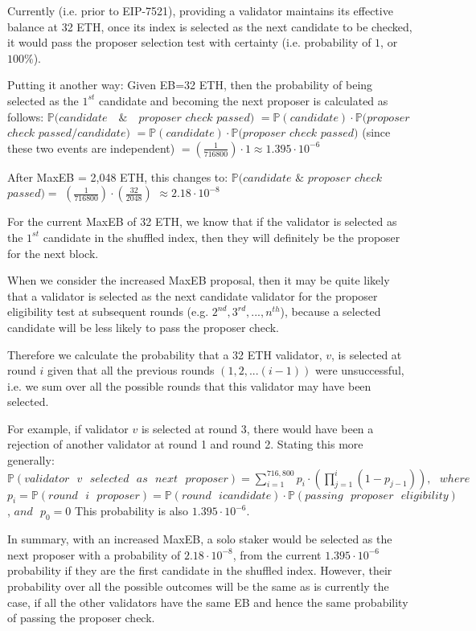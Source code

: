 \documentclass{article}
\newcommand{\prob}{\mathbb P}
\begin{document}
Currently (i.e. prior to EIP-7521), providing a validator maintains its
effective balance at 32 ETH, once its index is selected as the next candidate
to be checked, it would pass the proposer selection test with certainty (i.e.
probability of $1$, or $100\%$).


Putting it another way:
Given EB=32 ETH, then the probability of being selected as the $1^{st}$
candidate and becoming the next proposer is calculated as follows: $\prob(candidate
\texttt{ }$ $\&$ $\texttt{ }proposer$ $check$ $passed)$  $= \prob(candidate) \cdot
\prob(proposer$ $check$ $passed / candidate)$  $= \prob(candidate) \cdot \prob(proposer$
$check$ $passed)$ (since these two events are independent)  $=
\left(\frac{1}{716800}\right) \cdot 1 \approx 1.395 \cdot 10^{-6}$

After MaxEB = 2,048 ETH, this changes to:
$\prob(candidate$ $\&$ $proposer$ $check$ $passed) =$
$\left(\frac{1}{716800}\right) \cdot \left(\frac{32}{2048}\right)$
$\approx 2.18\cdot 10^{-8}$

For the current MaxEB of 32 ETH, we know that if the validator is selected as
the $1^{st}$ candidate in the shuffled index, then they will definitely be the
proposer for the next block.

When we consider the increased MaxEB proposal, then it may be quite likely that
a validator is selected as the next candidate validator for the proposer
eligibility test at subsequent rounds (e.g. $2^{nd}, 3^{rd}, ..., n^{th}$),
because a selected candidate will be less likely to pass the proposer check.

Therefore we calculate the probability that a 32 ETH validator, $v$, is
selected at round $i$ given that all the previous rounds $(1,2, ... (i-1))$
were unsuccessful, i.e. we sum over all the possible rounds that this validator
may have been selected.

For example, if validator $v$ is selected at round 3, there would have been a
rejection of another validator at round 1 and round 2. Stating this more
generally:  $\prob(validator \texttt{ } v \texttt{ } selected \texttt{ } as
\texttt{ } next \texttt{ } proposer) = \sum_{i=1}^{716,800} p_i \cdot  \left(
\prod_{j=1}^i (1-p_{j-1}) \right), \texttt{ } where$ 
$p_i = \prob(round \texttt{ }i \texttt{ } proposer) = \prob(round \texttt{ } i \texttt{
} candidate) \cdot  \prob(passing \texttt{ } proposer \texttt{ } eligibility)$, $and
\texttt{ } p_0 = 0$
This probability is also $1.395 \cdot  10^{-6}$.

In summary, with an increased MaxEB, a solo staker would be selected as the
next proposer with a probability of $2.18\cdot 10^{-8}$, from the current $1.395 \cdot 
10^{-6}$ probability if they are the first candidate in the shuffled index.
However, their probability over all the possible outcomes will be the same as
is currently the case, if all the other validators have the same EB and hence
the same probability of passing the proposer check.
\end{document}
